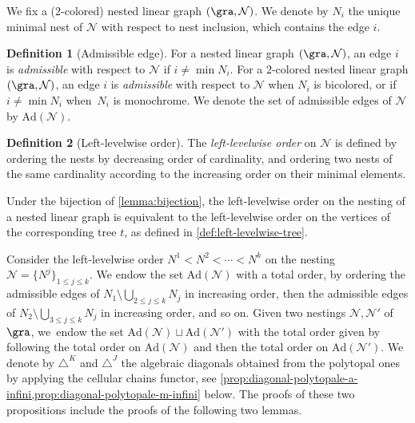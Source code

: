 \documentclass[JEP,XML,SOM,NoFloatCountersInSection,Unicode,published]{cedram}
\theoremstyle{definition}
\newtheorem{definition}{Definition}[section]
\theoremstyle{plain}
\begin{document}
We fix a ($2$-colored) nested linear graph $(\gra,\mathcal{N})$.
We denote by $N_i$ the unique minimal nest of $\mathcal{N}$ with respect to nest inclusion, which contains the edge $i$.

\begin{definition}[Admissible edge]
For a nested linear graph $(\gra,\mathcal{N})$, an edge $i$ is \emph{admissible} with respect to $\mathcal{N}$ if $i \neq \min N_i$.
For a $2$-colored nested linear graph $(\gra,\mathcal{N})$, an edge $i$ is \emph{admissible} with respect to $\mathcal{N}$ when $N_i$ is bicolored, or if $i \neq \min N_i$ when~$N_i$ is monochrome.
We denote the set of admissible edges of $\mathcal{N}$ by $\mathrm{Ad}(\mathcal{N})$.
\end{definition}

\begin{definition} [Left-levelwise order]
\label{def:left-levelwise-graph}
The \emph{left-levelwise order} on $\mathcal{N}$ is defined by ordering the nests by decreasing order of cardinality, and ordering two nests of the same cardinality according to the increasing order on their minimal elements.
\end{definition}

Under the bijection of \cref{lemma:bijection}, the left-levelwise order on the nesting of a nested linear graph is equivalent to the left-levelwise order on the vertices of the corresponding tree $t$, as defined in \cref{def:left-levelwise-tree}.

Consider the left-levelwise order $N^1<N^2<\cdots < N^k$ on the nesting $\mathcal{N}=\{N^j\}_{1\leq j \leq k}$.
We endow the set $\mathrm{Ad}(\mathcal{N})$ with a total order, by ordering the admissible edges of $N_1 \setminus \bigcup_{2\leq j \leq k} N_j$ in increasing order, then the admissible edges of $N_2 \setminus \bigcup_{3\leq j \leq k} N_j$ in increasing order, and so on.
Given two nestings $\mathcal{N}, \mathcal{N}'$ of $\gra$, we~endow the set $\mathrm{Ad}(\mathcal{N})\sqcup \mathrm{Ad}(\mathcal{N}')$ with the total order given by following the total order on $\mathrm{Ad}(\mathcal{N})$ and then the total order on $\mathrm{Ad}(\mathcal{N}')$.
We denote by $\triangle^K$ and $\triangle^J$ the algebraic diagonals obtained from the polytopal ones by applying the cellular chains functor, see \cref{prop:diagonal-polytopale-a-infini,prop:diagonal-polytopale-m-infini} below.
The proofs of these two propositions include the proofs of the following two lemmas.
\end{document}
